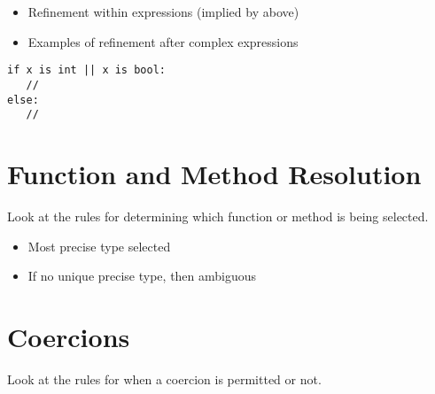 \begin{itemize}
\item Refinement within expressions (implied by above)
\item Examples of refinement after complex expressions
\end{itemize}

\begin{lstlisting}
if x is int || x is bool:
   //
else:
   //
\end{lstlisting}

\section{Function and Method Resolution}
Look at the rules for determining which function or method is being selected.

\begin{itemize}
\item Most precise type selected
\item If no unique precise type, then ambiguous

\end{itemize}


\section{Coercions}
Look at the rules for when a coercion is permitted or not.
